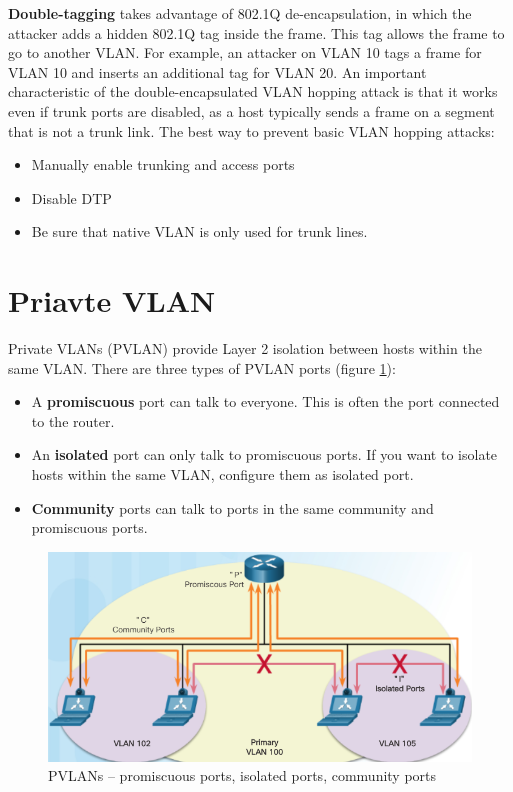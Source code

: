 \textbf{Double-tagging} takes advantage of 802.1Q de-encapsulation, in which the attacker adds a hidden 802.1Q tag inside the frame. This tag allows the frame to go to another VLAN. For example, an attacker on VLAN 10 tags a frame for VLAN 10 and inserts an additional tag for VLAN 20.  An important characteristic of the double-encapsulated VLAN hopping attack is that it works even if trunk ports are disabled, as a host typically sends a frame on a segment that is not a trunk link. The best way to prevent basic VLAN hopping attacks:

\begin{itemize}
\item Manually enable trunking and access ports
\item Disable DTP
\item Be sure that native VLAN is only used for trunk lines.
\end{itemize}

\section{Priavte VLAN}

Private VLANs (PVLAN) provide Layer 2 isolation between hosts within the same VLAN. There are three types of PVLAN ports (figure \ref{PVLAN}):

\begin{itemize}
\item A \textbf{promiscuous} port can talk to everyone. This is often the port connected to the router.
\item An \textbf{isolated} port can only talk to promiscuous ports. If you want to isolate hosts within the same VLAN, configure them as isolated port.
\item \textbf{Community} ports can talk to ports in the same community and promiscuous ports.
\end{itemize}

\begin{figure}[hbtp]
\caption{PVLANs -- promiscuous ports, isolated ports, community ports}\label{PVLAN}
\centering
\includegraphics[scale=0.5]{pictures/PVLAN.PNG}
\end{figure}

